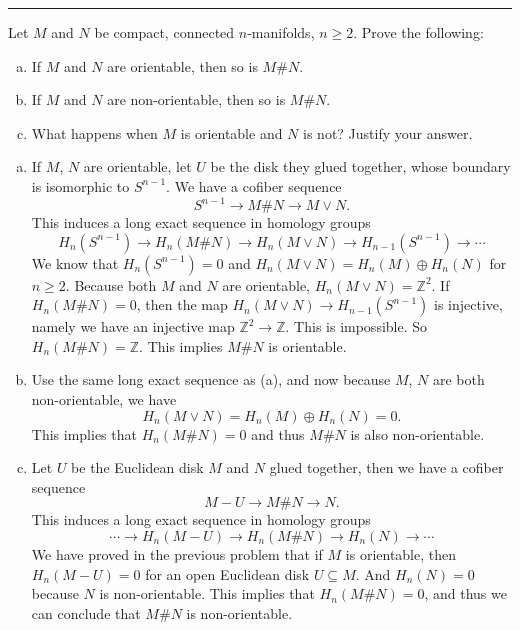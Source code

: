 \documentclass[letterpaper, 12pt]{article}
\begin{document}
\noindent\rule{7in}{2.8pt}
\begin{problem}{3}
Let \(M\) and \(N\) be compact, connected \(n\)-manifolds, \(n\geq 2\). Prove the following:
\begin{enumerate}[(a)]
\item If \(M\) and \(N\) are orientable, then so is \(M\#N\). 
\item If \(M\) and \(N\) are non-orientable, then so is \(M\#N\).
\item What happens when \(M\) is orientable and \(N\) is not? Justify your answer.
\end{enumerate}
\end{problem}
\begin{solution}
\begin{enumerate}[(a)]
\item If \(M\), \(N\) are orientable, let \(U\) be the disk they glued together, whose boundary is isomorphic to \(S^{n-1}\). We have a cofiber sequence 
\[S^{n-1}\rightarrow M\#N\rightarrow M\vee N.\]
This induces a long exact sequence in homology groups 
\[H_n(S^{n-1})\rightarrow H_n(M\#N)\rightarrow H_n(M\vee N)\rightarrow H_{n-1}(S^{n-1})\rightarrow \cdots\]
We know that \(H_n(S^{n-1})=0\) and \(H_n(M\vee N)=H_n(M)\oplus H_n(N)\) for \(n\geq 2\). Because both \(M\) and \(N\) are orientable, \(H_n(M\vee N)=\mathbb{Z}^2\). If \(H_n(M\#N)=0\), then the map \(H_n(M\vee N)\rightarrow H_{n-1}(S^{n-1})\) is injective, namely we have an injective map \(\mathbb{Z}^2\rightarrow \mathbb{Z}\). This is impossible. So \(H_n(M\#N)=\mathbb{Z}\). This implies \(M\#N\) is orientable. 
\item Use the same long exact sequence as (a), and now because \(M\), \(N\) are both non-orientable, we have 
\[H_n(M\vee N)=H_n(M)\oplus H_n(N)=0.\]
This implies that \(H_n(M\#N)=0\) and thus \(M\#N\) is also non-orientable.
\item Let \(U\) be the Euclidean disk \(M\) and \(N\) glued together, then we have a cofiber sequence
\[M-U\rightarrow M\# N\rightarrow N.\]
This induces a long exact sequence in homology groups 
\[\cdots\rightarrow H_n(M-U)\rightarrow H_n(M\# N)\rightarrow H_n(N)\rightarrow \cdots\]
We have proved in the previous problem that if \(M\) is orientable, then \(H_n(M-U)=0\) for an open Euclidean disk \(U\subseteq M\). And \(H_n(N)=0\) because \(N\) is non-orientable. This implies that \(H_n(M\#N)=0\), and thus we can conclude that \(M\#N\) is non-orientable. 
\end{enumerate}
\end{solution}
\end{document}
